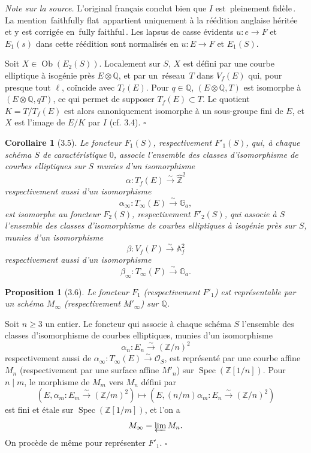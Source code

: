 \documentclass[10pt]{article}
\newcommand{\Af}{\mathbb A_f}
\newcommand{\Q}{\mathbb Q}
\newcommand{\Z}{\mathbb Z}
\newcommand{\bZ}{\widehat{\mathbb Z}}
\newcommand{\Ga}{\mathbb G_a}
\newcommand{\Spec}{\operatorname{Spec}}
\newcommand{\cO}{\mathcal O}
\newcommand{\QED}{\hfill$\square$}
\newcommand{\frquote}[1]{\guillemotleft{}\,#1\,\guillemotright{}}
\newtheorem*{proposition}{Proposition}
\newtheorem*{corollary}{Corollaire}
\begin{document}
\noindent\emph{Note sur la source.} L'original français conclut bien que $I$ est
\frquote{pleinement fidèle}. La mention \frquote{faithfully flat} appartient uniquement à la
réédition anglaise héritée et y est corrigée en \frquote{fully faithful}. Les lapsus de casse
évidents $u:e\to F$ et $E_1(s)$ dans cette réédition sont normalisés en $u:E\to F$ et
$E_1(S)$.

Soit $X\in\operatorname{Ob}(E_2(S))$. Localement sur $S$, $X$ est défini par une courbe
elliptique à isogénie près $E\otimes\Q$, et par un \frquote{réseau} $T$ dans $V_f(E)$ qui, pour
presque tout $\ell$, coïncide avec $T_\ell(E)$. Pour $q\in\Q$, $(E\otimes\Q,T)$ est
isomorphe à $(E\otimes\Q,qT)$, ce qui permet de supposer $T_f(E)\subset T$. Le quotient
$K=T/T_f(E)$ est alors canoniquement isomorphe à un sous-groupe fini de $E$, et $X$ est
l'image de $E/K$ par $I$ (cf. 3.4). \QED

\begin{corollary}[3.5]
Le foncteur $F_1(S)$, respectivement $F'_1(S)$, qui, à chaque schéma $S$ de
caractéristique $0$, associe l'ensemble des classes d'isomorphisme de courbes elliptiques sur $S$
munies d'un isomorphisme
\[
\alpha:T_f(E)\xrightarrow{\sim}\bZ^2
\]
respectivement aussi d'un isomorphisme
\[
\alpha_\infty:T_\infty(E)\xrightarrow{\sim}\Ga,
\]
est isomorphe au foncteur $F_2(S)$, respectivement $F'_2(S)$, qui associe à $S$ l'ensemble
des classes d'isomorphisme de courbes elliptiques à isogénie près sur $S$, munies d'un
isomorphisme
\[
\beta:V_f(F)\xrightarrow{\sim}\Af^2
\]
respectivement aussi d'un isomorphisme
\[
\beta_\infty:T_\infty(F)\xrightarrow{\sim}\Ga.
\]
\end{corollary}

\begin{proposition}[3.6]
Le foncteur $F_1$ (respectivement $F'_1$) est représentable par un schéma $M_\infty$
(respectivement $M'_\infty$) sur $\Q$.
\end{proposition}

Soit $n\ge 3$ un entier. Le foncteur qui associe à chaque schéma $S$ l'ensemble des
classes d'isomorphisme de courbes elliptiques, munies d'un isomorphisme
\[
\alpha_n:E_n\xrightarrow{\sim}(\Z/n)^2
\]
respectivement aussi de $\alpha_\infty:T_\infty(E)\xrightarrow{\sim}\cO_S$, est représenté
par une courbe affine $M_n$ (respectivement par une surface affine $M'_n$) sur
$\Spec(\Z[1/n])$. Pour $n\mid m$, le morphisme de $M_m$ vers $M_n$ défini par
\[
(E,\alpha_m:E_m\xrightarrow{\sim}(\Z/m)^2)
\longmapsto
(E,(n/m)\alpha_m:E_n\xrightarrow{\sim}(\Z/n)^2)
\]
est fini et étale sur $\Spec(\Z[1/m])$, et l'on a
\[
M_\infty=\varprojlim M_n .
\]
On procède de même pour représenter $F'_1$. \QED
\end{document}
